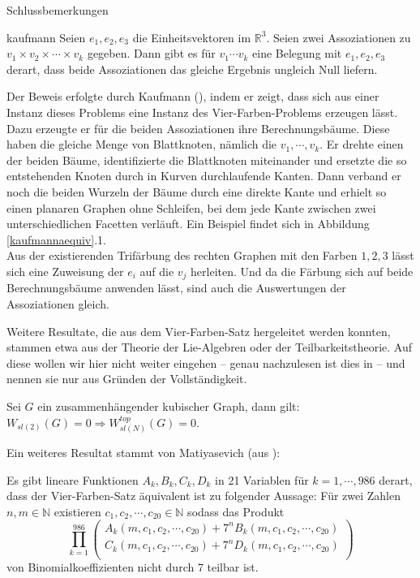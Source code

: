 \begin{chapter}{Schlussbemerkungen}
 \begin{satzl}{ }{kaufmann}
  Seien $e_1, e_2, e_3$ die Einheitsvektoren im $\mathbb{R}^3$. Seien zwei Assoziationen zu $v_1 \times v_2 \times \cdots \times v_k$ gegeben. Dann gibt es für $v_1 \cdots v_k$ eine Belegung mit $e_1,e_2,e_3$ derart, dass beide Assoziationen das gleiche Ergebnis ungleich Null liefern.
 \end{satzl}
 
 Der Beweis erfolgte durch Kaufmann (\cite{kaufmann}), indem er zeigt, dass sich aus einer Instanz dieses Problems eine Instanz des Vier-Farben-Problems erzeugen lässt. Dazu erzeugte er für die beiden Assoziationen ihre Berechnungsbäume. Diese haben die gleiche Menge von Blattknoten, nämlich die $v_1,\cdots,v_k$. Er drehte einen der beiden Bäume, identifizierte die Blattknoten miteinander und ersetzte die so entstehenden Knoten durch in Kurven durchlaufende Kanten. Dann verband er noch die beiden Wurzeln der Bäume durch eine direkte Kante und erhielt so einen planaren Graphen ohne Schleifen, bei dem jede Kante zwischen zwei unterschiedlichen Facetten verläuft. Ein Beispiel findet sich in Abbildung \ref{kaufmannaequiv}.1.\\
 Aus der existierenden Trifärbung des rechten Graphen mit den Farben $1,2,3$ lässt sich eine Zuweisung der $e_i$ auf die $v_j$ herleiten. Und da die Färbung sich auf beide Berechnungsbäume anwenden lässt, sind auch die Auswertungen der Assoziationen gleich.
 
 Weitere Resultate, die aus dem Vier-Farben-Satz hergeleitet werden konnten, stammen etwa aus der Theorie der Lie-Algebren oder der Teilbarkeitstheorie. Auf diese wollen wir hier nicht weiter eingehen -- genau nachzulesen ist dies in \cite{BarNatar} -- und nennen sie nur aus Gründen der Vollständigkeit.
 
 \begin{satz}{}
  Sei $G$ ein zusammenhängender kubischer Graph, dann gilt: $W_{sl(2)}(G) = 0 \Rightarrow W_{sl(N)}^{top}(G) = 0$.
 \end{satz}
 
 Ein weiteres Resultat stammt von Matiyasevich (aus \cite{matiyasevich}):
 
 \begin{satz}{}
  Es gibt lineare Funktionen $A_k,B_k,C_k,D_k$ in 21 Variablen für $k = 1,\cdots,986$ derart, dass der Vier-Farben-Satz äquivalent ist zu folgender Aussage: Für zwei Zahlen $n,m \in \mathbb{N}$ existieren $c_1,c_2,\cdots,c_{20} \in \mathbb{N}$ sodass das Produkt
  \[ \prod_{k=1}^{986} \begin{pmatrix}
                        A_k(m,c_1,c_2,\cdots,c_{20})+7^nB_k(m,c_1,c_2,\cdots,c_{20}) \\
                        C_k(m,c_1,c_2,\cdots,c_{20})+7^nD_k(m,c_1,c_2,\cdots,c_{20}) \\
                       \end{pmatrix} \]
  von Binomialkoeffizienten nicht durch 7 teilbar ist.
 \end{satz}
\end{chapter}